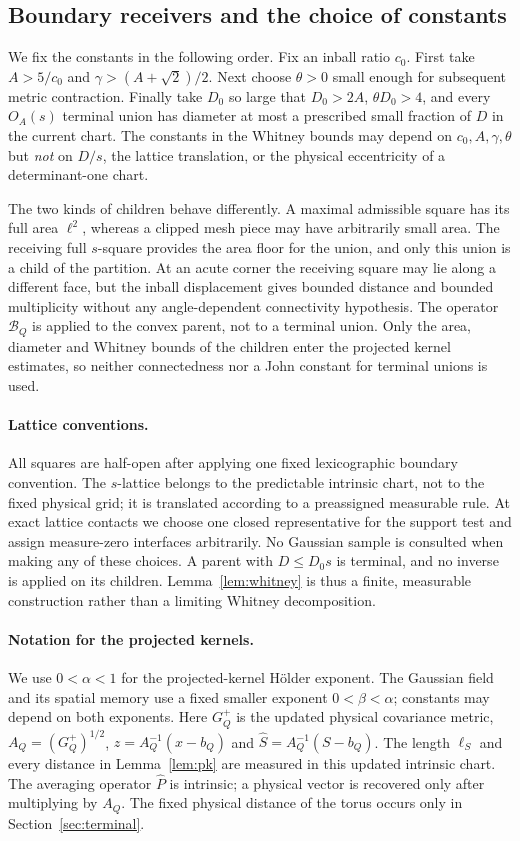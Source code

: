 \documentclass[11pt]{article}
\theoremstyle{definition}
\theoremstyle{remark}
\numberwithin{equation}{section}
\begin{document}
\subsection{Boundary receivers and the choice of constants}
We fix the constants in the following order.
Fix an inball ratio $c_0$. First take $A>5/c_0$ and
$\gamma>(A+\sqrt2)/2$. Next choose $\theta>0$ small enough for
subsequent metric contraction. Finally take $D_0$ so large that
$D_0>2A$, $\theta D_0>4$, and every $O_A(s)$ terminal union has
diameter at most a prescribed small fraction of $D$ in the current chart. The constants
in the Whitney bounds may depend on $c_0,A,\gamma,\theta$ but
\emph{not} on $D/s$, the lattice translation, or the physical
eccentricity of a determinant-one chart.

The two kinds of children behave differently. A maximal admissible
square has its full area $\ell^2$, whereas a clipped mesh piece may
have arbitrarily small area. The receiving full $s$-square provides
the area floor for the union, and only this union is a child of
the partition. At an acute corner the receiving square may lie
along a different face, but the inball displacement gives
bounded distance and bounded multiplicity without any
angle-dependent connectivity hypothesis. The operator
$\mathcal B_Q$ is applied to the convex parent, not to a terminal
union. Only the area, diameter and Whitney bounds of the children
enter the projected kernel estimates, so neither connectedness nor
a John constant for terminal unions is used.

\paragraph{Lattice conventions.}
All squares are half-open after applying one fixed lexicographic
boundary convention. The $s$-lattice belongs to the predictable
intrinsic chart, not to the fixed physical grid; it is translated
according to a preassigned measurable rule. At exact lattice contacts we choose
one closed representative for the support test and assign
measure-zero interfaces arbitrarily. No Gaussian sample is
consulted when making any of these choices. A parent with
$D\le D_0s$ is terminal, and no inverse is applied on its
children. Lemma~\ref{lem:whitney} is thus a finite, measurable
construction rather than a limiting Whitney decomposition.


\paragraph{Notation for the projected kernels.}
\label{not:holderparameters}
We use $0<\alpha<1$ for the projected-kernel H\"older exponent.
The Gaussian field and its spatial memory use a fixed smaller exponent
$0<\beta<\alpha$; constants may depend on both exponents.
Here $G_Q^+$ is the updated physical covariance metric, $A_Q=(G_Q^+)^{1/2}$,
$z=A_Q^{-1}(x-b_Q)$ and $\widehat S=A_Q^{-1}(S-b_Q)$.  The length
$\ell_S$ and every distance in Lemma~\ref{lem:pk} are measured in
this updated intrinsic chart.  The averaging operator $\widehat P$
is intrinsic; a physical vector is recovered only after multiplying
by $A_Q$.  The fixed physical distance of the torus occurs only in
Section~\ref{sec:terminal}.
\end{document}
